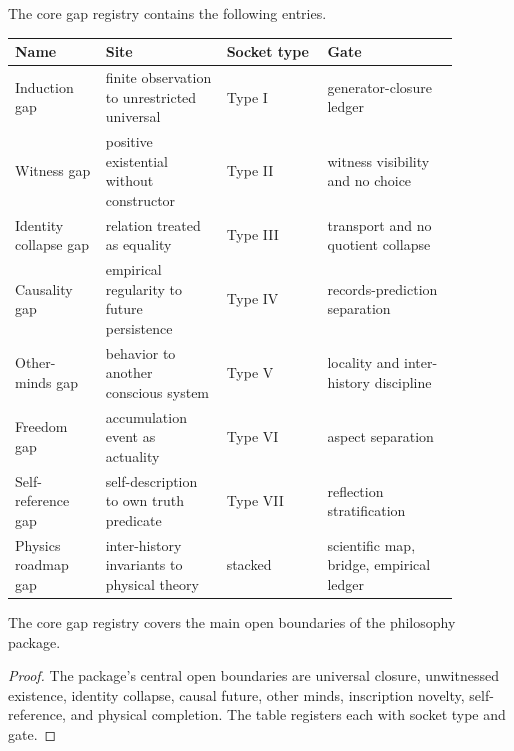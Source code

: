 \begin{definition}
\label{def:philosophy-core-gap-registry}
The core gap registry contains the following entries.

\begin{center}
\begin{tabular}{p{0.18\linewidth}p{0.24\linewidth}p{0.20\linewidth}p{0.26\linewidth}}
\textbf{Name} & \textbf{Site} & \textbf{Socket type} & \textbf{Gate} \\
\hline
Induction gap & finite observation to unrestricted universal & Type I & generator-closure ledger \\
Witness gap & positive existential without constructor & Type II & witness visibility and no choice \\
Identity collapse gap & relation treated as equality & Type III & transport and no quotient collapse \\
Causality gap & empirical regularity to future persistence & Type IV & records-prediction separation \\
Other-minds gap & behavior to another conscious system & Type V & locality and inter-history discipline \\
Freedom gap & accumulation event as actuality & Type VI & aspect separation \\
Self-reference gap & self-description to own truth predicate & Type VII & reflection stratification \\
Physics roadmap gap & inter-history invariants to physical theory & stacked & scientific map, bridge, empirical ledger \\
\end{tabular}
\end{center}
\end{definition}

\begin{theorem}
\label{thm:philosophy-gap-registry-coverage}
The core gap registry covers the main open boundaries of the philosophy
package.
\end{theorem}
\begin{proof}
The package's central open boundaries are universal closure,
unwitnessed existence, identity collapse, causal future, other minds,
inscription novelty, self-reference, and physical completion. The table
registers each with socket type and gate.
\end{proof}

